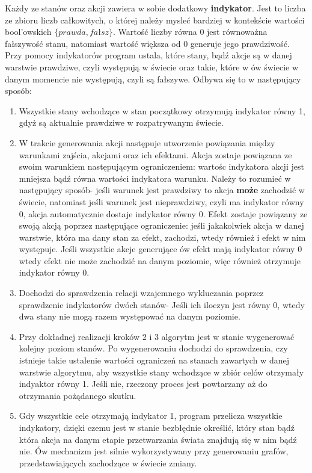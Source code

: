     Każdy ze stanów oraz akcji zawiera w sobie dodatkowy \textbf{indykator}. Jest to liczba ze zbioru liczb całkowitych, o której 
    należy mysleć bardziej w kontekście wartości bool'owskich $\{prawda,fałsz\}$. Wartość liczby równa 0 jest równoważna fałszywość stanu, natomiast wartość większa od 0 generuje jego
    prawdziwość. Przy pomocy indykatorów program ustala, które stany, bądź akcje 
    są w danej warstwie prawdziwe, czyli występują w świecie oraz takie, które
    w ów świecie w danym momencie nie występują, czyli są fałszywe. 
    Odbywa się to w następujący sposób:
    \begin{enumerate}
        \item Wszystkie stany wchodzące w stan początkowy otrzymują indykator równy 1, gdyż są aktualnie prawdziwe 
        w rozpatrywanym świecie.
        \item W trakcie generowania akcji następuje utworzenie powiązania między warunkami zajścia, akcjami oraz ich efektami.
        Akcja zostaje powiązana ze swoim warunkiem następującym ograniczeniem: wartośc indykatora akcji jest mniejsza bądź równa wartości 
        indykatora warunku. Należy to rozumieć w następujący sposób- jeśli warunek jest prawdziwy to akcja \textbf{może} zachodzić w świecie, natomiast 
        jeśli warunek jest nieprawdziwy, czyli ma indykator równy 0, akcja automatycznie dostaje indykator równy 0.
        Efekt zostaje powiązany ze swoją akcją poprzez następujące ograniczenie: jeśli jakakolwiek akcja w danej warstwie, 
        która ma dany stan za efekt, zachodzi, wtedy również i efekt w nim występuje. Jeśli wszystkie akcje generujące ów efekt mają indykator równy 0 
        wtedy efekt nie może zachodzić na danym poziomie, więc również otrzymuje indykator równy 0.
        \item Dochodzi do sprawdzenia relacji wzajemnego wykluczania poprzez sprawdzenie indykatorów dwóch stanów- Jeśli ich iloczyn jest równy 0, wtedy 
        dwa stany nie mogą razem występować na danym poziomie.
        \item Przy dokładnej realizacji kroków 2 i 3 algorytm jest w stanie wygenerować kolejny poziom stanów. Po wygenerowaniu 
        dochodzi do sprawdzenia, czy istnieje takie ustalenie wartości ograniczeń na stanach zawartych w danej warstwie algorytmu, aby wszystkie 
        stany wchodzące w zbiór celów otrzymały indyaktor równy 1. Jeśli nie, 
        rzeczony proces jest powtarzany aż do otrzymania pożądanego skutku.
        \item Gdy wszystkie cele otrzymają indykator 1, program przelicza wszystkie indykatory, dzięki czemu jest w stanie bezbłędnie określić, który 
        stan bądź która akcja na danym etapie przetwarzania świata znajdują się w nim bądź nie. Ów mechanizm jest silnie wykorzystywany 
        przy generowaniu grafów, przedstawiających zachodzące w świecie zmiany.
    \end{enumerate}


